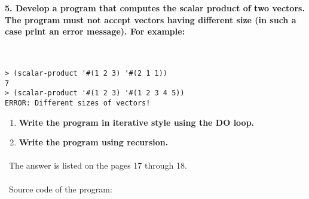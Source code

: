 \documentclass{article}
\begin{document}
\paragraph{}\
\paragraph{}\

\paragraph{5. Develop a program that computes the scalar product of two vectors. The program must not accept vectors having different size (in such a case print an error message). For example: }\

\begin{verbatim} 
> (scalar-product '#(1 2 3) '#(2 1 1))
7
> (scalar-product '#(1 2 3) '#(1 2 3 4 5))
ERROR: Different sizes of vectors!
\end{verbatim}

\begin{enumerate}[label=(\alph*)]

	\item \textbf{Write the program in iterative style using the DO loop.}
	
	\item \textbf{Write the program using recursion.}
					
\end{enumerate}

\paragraph{}\
	The answer is listed on the pages 17 through 18.
	
\paragraph{}\
Source code of the program:
	
\end{document}
